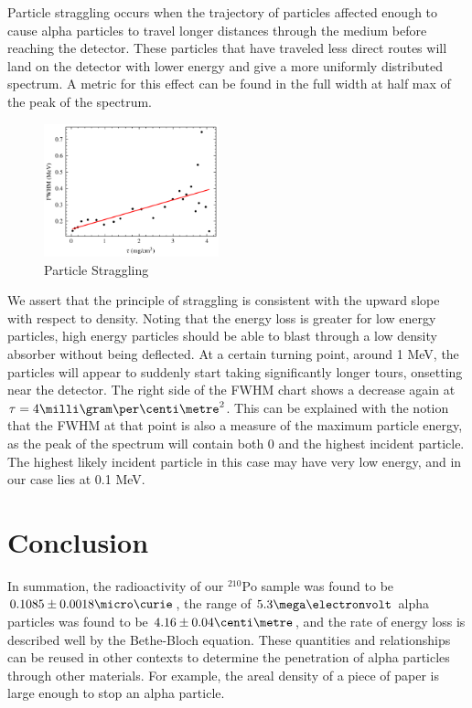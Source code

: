 \documentclass[12pt]{article}
\newcommand{\po}{{}^{210}\text{Po}}
\begin{document}
\begin{multicols}{2}
    Particle straggling occurs when the trajectory of particles affected enough to cause alpha particles to travel longer distances through the medium before reaching the detector. These particles that have traveled less direct routes will land on the detector with lower energy and give a more uniformly distributed spectrum. A metric for this effect can be found in the full width at half max of the peak of the spectrum. 
    
    \begin{figure}[H]
        \includegraphics[width=0.45\textwidth]{charts/FWHM.png}
        \caption{Particle Straggling}
        \label{fwhm}
    \end{figure}
    
    We assert that the principle of straggling is consistent with the upward slope with respect to density. Noting that the energy loss is greater for low energy particles, high energy particles should be able to blast through a low density absorber without being deflected. At a certain turning point, around 1 MeV, the particles will appear to suddenly start taking significantly longer tours, onsetting near the detector. The right side of the FWHM chart shows a decrease again at $\tau = 4 \milli \gram \per \centi \metre^2$. This can be explained with the notion that the FWHM at that point is also a measure of the maximum particle energy, as the peak of the spectrum will contain both 0 and the highest incident particle. The highest likely incident particle in this case may have very low energy, and in our case lies at 0.1 MeV.

    \section{Conclusion}
    In summation, the radioactivity of our $\po$ sample was found to be $0.1085 \pm 0.0018 \micro\curie$, the range of $5.3 \mega \electronvolt$ alpha particles was found to be $4.16 \pm 0.04 \centi \metre$, and the rate of energy loss is described well by the Bethe-Bloch equation. These quantities and relationships can be reused in other contexts to determine the penetration of alpha particles through other materials. For example, the areal density of a piece of paper is large enough to stop an alpha particle.




\end{multicols}
\end{document}
